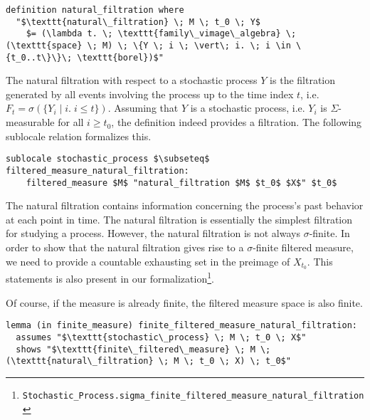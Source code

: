 \begin{isadefinition}
{\small
\begin{lstlisting}[style=isabelle]
definition natural_filtration where
  "$\texttt{natural\_filtration} \; M \; t_0 \; Y$
	$= (\lambda t. \; \texttt{family\_vimage\_algebra} \; (\texttt{space} \; M) \; \{Y \; i \; \vert\; i. \; i \in \{t_0..t\}\}\; \texttt{borel})$"
\end{lstlisting}
}
\end{isadefinition}
The natural filtration with respect to a stochastic process $Y$ is the filtration generated by all events involving the process up to the time index $t$, i.e. $F_t = \sigma(\{Y_i \; \vert\; i. \; i \le t\})$. Assuming that $Y$ is a stochastic process, i.e. $Y_i$ is $\Sigma$-measurable for all $i \ge t_0$, the definition indeed provides a filtration. The following sublocale relation formalizes this.

\begin{isalemma}
{\small
\begin{lstlisting}[style=isabelle]
sublocale stochastic_process $\subseteq$ filtered_measure_natural_filtration: 
	filtered_measure $M$ "natural_filtration $M$ $t_0$ $X$" $t_0$
\end{lstlisting}
}
\end{isalemma}

The natural filtration contains information concerning the process's past behavior at each point in time. The natural filtration is essentially the simplest filtration for studying a process. However, the natural filtration is not always $\sigma$-finite. In order to show that the natural filtration gives rise to a $\sigma$-finite filtered measure, we need to provide a countable exhausting set in the preimage of $X_{t_0}$. This statements is also present in our formalization\footnote{\texttt{Stochastic\_Process.sigma\_finite\_filtered\_measure\_natural\_filtration}}.

Of course, if the measure is already finite, the filtered measure space is also finite.

\begin{isalemma}
{\small
\begin{lstlisting}[style=isabelle]
lemma (in finite_measure) finite_filtered_measure_natural_filtration:
  assumes "$\texttt{stochastic\_process} \; M \; t_0 \; X$"
  shows "$\texttt{finite\_filtered\_measure} \; M \; (\texttt{natural\_filtration} \; M \; t_0 \; X) \; t_0$"
\end{lstlisting}
}
\end{isalemma}

